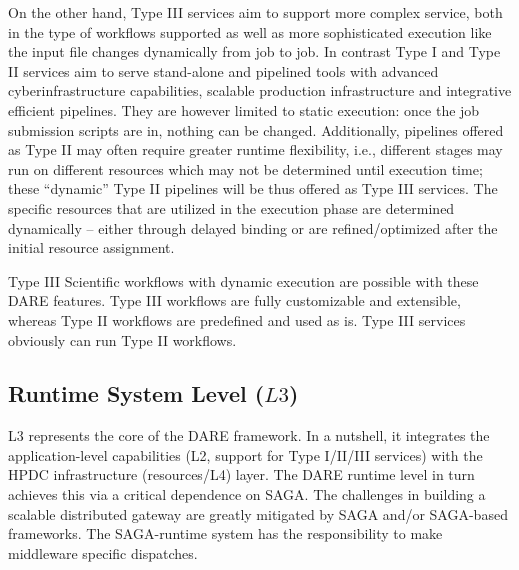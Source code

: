 \documentclass[]{svjour3}
\begin{document}
On the other hand, Type III services aim to support more complex
service, both in the type of workflows supported as well as more
sophisticated execution like the input file changes dynamically from job to 
job. In contrast Type I and Type II services aim to serve
stand-alone and pipelined tools with advanced cyberinfrastructure
capabilities, scalable production infrastructure and integrative
efficient pipelines. They are however limited to static execution:
once the job submission scripts are in, nothing can be changed.
Additionally, pipelines offered as Type II may often require greater
runtime flexibility, i.e., different stages may run on different
resources which may not be determined until execution time; these
``dynamic'' Type II pipelines will be thus offered as Type III
services.  The specific resources
that are utilized in the execution phase are determined dynamically --
either through delayed binding or are refined/optimized after the
initial resource assignment.

Type III Scientific workflows with dynamic execution are possible with
these  DARE features. Type III workflows
are fully customizable and extensible, whereas Type II workflows are predefined and
used as is.  Type III services obviously can run Type II workflows.

\subsection{Runtime System Level ($L3$)}

L3 represents the core of the DARE framework. In a nutshell, it
integrates the application-level capabilities (L2, support for Type
I/II/III services) with the HPDC infrastructure (resources/L4) layer. The DARE
runtime level in turn achieves this via a critical dependence on
SAGA. The challenges in building a scalable distributed gateway are
greatly mitigated by SAGA and/or SAGA-based frameworks. The
SAGA-runtime system has the responsibility to make middleware specific
dispatches.
\end{document}
